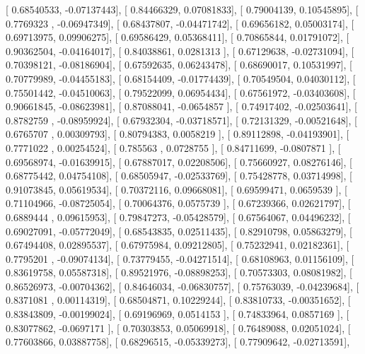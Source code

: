 \documentclass{article}
\begin{document}
       [ 0.68540533, -0.07137443],
       [ 0.84466329,  0.07081833],
       [ 0.79004139,  0.10545895],
       [ 0.7769323 , -0.06947349],
       [ 0.68437807, -0.04471742],
       [ 0.69656182,  0.05003174],
       [ 0.69713975,  0.09906275],
       [ 0.69586429,  0.05368411],
       [ 0.70865844,  0.01791072],
       [ 0.90362504, -0.04164017],
       [ 0.84038861,  0.0281313 ],
       [ 0.67129638, -0.02731094],
       [ 0.70398121, -0.08186904],
       [ 0.67592635,  0.06243478],
       [ 0.68690017,  0.10531997],
       [ 0.70779989, -0.04455183],
       [ 0.68154409, -0.01774439],
       [ 0.70549504,  0.04030112],
       [ 0.75501442, -0.04510063],
       [ 0.79522099,  0.06954434],
       [ 0.67561972, -0.03403608],
       [ 0.90661845, -0.08623981],
       [ 0.87088041, -0.0654857 ],
       [ 0.74917402, -0.02503641],
       [ 0.8782759 , -0.08959924],
       [ 0.67932304, -0.03718571],
       [ 0.72131329, -0.00521648],
       [ 0.6765707 ,  0.00309793],
       [ 0.80794383,  0.0058219 ],
       [ 0.89112898, -0.04193901],
       [ 0.7771022 ,  0.00254524],
       [ 0.785563  ,  0.0728755 ],
       [ 0.84711699, -0.0807871 ],
       [ 0.69568974, -0.01639915],
       [ 0.67887017,  0.02208506],
       [ 0.75660927,  0.08276146],
       [ 0.68775442,  0.04754108],
       [ 0.68505947, -0.02533769],
       [ 0.75428778,  0.03714998],
       [ 0.91073845,  0.05619534],
       [ 0.70372116,  0.09668081],
       [ 0.69599471,  0.0659539 ],
       [ 0.71104966, -0.08725054],
       [ 0.70064376,  0.0575739 ],
       [ 0.67239366,  0.02621797],
       [ 0.6889444 ,  0.09615953],
       [ 0.79847273, -0.05428579],
       [ 0.67564067,  0.04496232],
       [ 0.69027091, -0.05772049],
       [ 0.68543835,  0.02511435],
       [ 0.82910798,  0.05863279],
       [ 0.67494408,  0.02895537],
       [ 0.67975984,  0.09212805],
       [ 0.75232941,  0.02182361],
       [ 0.7795201 , -0.09074134],
       [ 0.73779455, -0.04271514],
       [ 0.68108963,  0.01156109],
       [ 0.83619758,  0.05587318],
       [ 0.89521976, -0.08898253],
       [ 0.70573303,  0.08081982],
       [ 0.86526973, -0.00704362],
       [ 0.84646034, -0.06830757],
       [ 0.75763039, -0.04239684],
       [ 0.8371081 ,  0.00114319],
       [ 0.68504871,  0.10229244],
       [ 0.83810733, -0.00351652],
       [ 0.83843809, -0.00199024],
       [ 0.69196969,  0.0514153 ],
       [ 0.74833964,  0.0857169 ],
       [ 0.83077862, -0.0697171 ],
       [ 0.70303853,  0.05069918],
       [ 0.76489088,  0.02051024],
       [ 0.77603866,  0.03887758],
       [ 0.68296515, -0.05339273],
       [ 0.77909642, -0.02713591],
\end{document}
